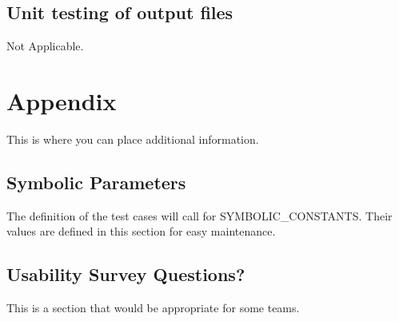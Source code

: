 \documentclass[12pt, titlepage]{article}
\begin{document}
\subsection{Unit testing of output files}	
Not Applicable.	





\newpage

\section{Appendix}

This is where you can place additional information.

\subsection{Symbolic Parameters}

The definition of the test cases will call for SYMBOLIC\_CONSTANTS.
Their values are defined in this section for easy maintenance.

\subsection{Usability Survey Questions?}

This is a section that would be appropriate for some teams.
\end{document}
